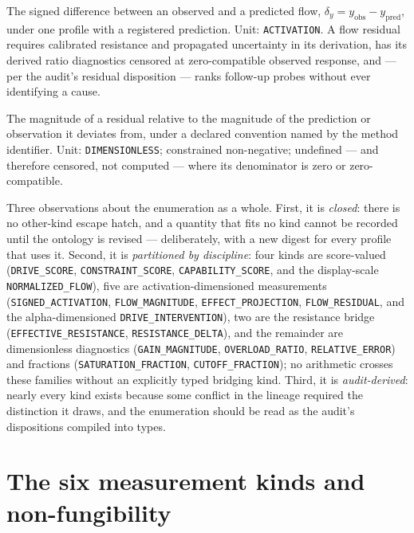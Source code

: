 \begin{definition}\label{ch03:qk:residual}
The signed difference between an observed and a predicted flow, $\delta_y = y_{\mathrm{obs}} - y_{\mathrm{pred}}$, under one profile with a registered prediction. Unit: \texttt{ACTIVATION}. A flow residual requires calibrated resistance and propagated uncertainty in its derivation, has its derived ratio diagnostics censored at zero-compatible observed response, and --- per the audit's residual disposition --- ranks follow-up probes without ever identifying a cause.
\end{definition}

\begin{definition}\label{ch03:qk:relerr}
The magnitude of a residual relative to the magnitude of the prediction or observation it deviates from, under a declared convention named by the method identifier. Unit: \texttt{DIMENSIONLESS}; constrained non-negative; undefined --- and therefore censored, not computed --- where its denominator is zero or zero-compatible.
\end{definition}

Three observations about the enumeration as a whole. First, it is \emph{closed}: there is no other-kind escape hatch, and a quantity that fits no kind cannot be recorded until the ontology is revised --- deliberately, with a new digest for every profile that uses it. Second, it is \emph{partitioned by discipline}: four kinds are score-valued (\texttt{DRIVE\_SCORE}, \texttt{CONSTRAINT\_SCORE}, \texttt{CAPABILITY\_SCORE}, and the display-scale \texttt{NORMALIZED\_FLOW}), five are activation-dimensioned measurements (\texttt{SIGNED\_ACTIVATION}, \texttt{FLOW\_MAGNITUDE}, \texttt{EFFECT\_PROJECTION}, \texttt{FLOW\_RESIDUAL}, and the alpha-dimensioned \texttt{DRIVE\_INTERVENTION}), two are the resistance bridge (\texttt{EFFECTIVE\_RESISTANCE}, \texttt{RESISTANCE\_DELTA}), and the remainder are dimensionless diagnostics (\texttt{GAIN\_MAGNITUDE}, \texttt{OVERLOAD\_RATIO}, \texttt{RELATIVE\_ERROR}) and fractions (\texttt{SATURATION\_FRACTION}, \texttt{CUTOFF\_FRACTION}); no arithmetic crosses these families without an explicitly typed bridging kind. Third, it is \emph{audit-derived}: nearly every kind exists because some conflict in the lineage required the distinction it draws, and the enumeration should be read as the audit's dispositions compiled into types.

\section{The six measurement kinds and non-fungibility}\label{ch03:measurement}

